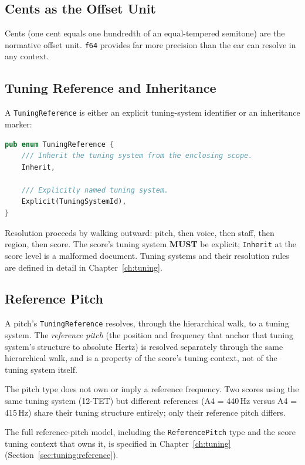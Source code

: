 \documentclass[11pt,letterpaper]{report}
\newcommand{\MUST}{\textbf{MUST}}
\begin{document}
\subsection{Cents as the Offset Unit}

Cents (one cent equals one hundredth of an equal-tempered semitone) are
the normative offset unit. \texttt{f64} provides far more precision than
the ear can resolve in any context.

\subsection{Tuning Reference and Inheritance}
\label{sec:pitch:tuning-inherit}

A \texttt{TuningReference} is either an explicit tuning-system identifier
or an inheritance marker:

\begin{lstlisting}[language=Rust]
pub enum TuningReference {
    /// Inherit the tuning system from the enclosing scope.
    Inherit,

    /// Explicitly named tuning system.
    Explicit(TuningSystemId),
}
\end{lstlisting}

Resolution proceeds by walking outward: pitch, then voice, then staff,
then region, then score. The score's tuning system \MUST{} be explicit;
\texttt{Inherit} at the score level is a malformed document. Tuning
systems and their resolution rules are defined in detail in
Chapter~\ref{ch:tuning}.

\subsection{Reference Pitch}
\label{sec:pitch:reference}

A pitch's \texttt{TuningReference} resolves, through the hierarchical
walk, to a tuning system. The \emph{reference pitch} (the position
and frequency that anchor that tuning system's structure to absolute
Hertz) is resolved separately through the same hierarchical walk, and
is a property of the score's tuning context, not of the tuning system
itself.

The pitch type does not own or imply a reference frequency. Two
scores using the same tuning system (12-TET) but different references
(A4 = 440\,Hz versus A4 = 415\,Hz) share their tuning structure
entirely; only their reference pitch differs.

The full reference-pitch model, including the \texttt{ReferencePitch}
type and the score tuning context that owns it, is specified in
Chapter~\ref{ch:tuning} (Section~\ref{sec:tuning:reference}).
\end{document}
